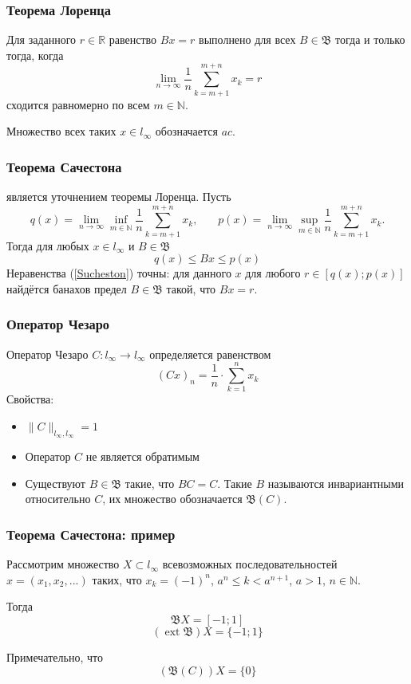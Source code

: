\documentclass[10pt,pdf,hyperref={unicode}]{beamer}
\begin{document}
\begin{frame}\frametitle{Теорема Лоренца}
	Для заданного $r\in\mathbb{R}$ равенство $Bx=r$ выполнено для всех $B\in\mathfrak{B}$
	тогда и только тогда, когда
	\begin{equation*}
		\lim_{n\to\infty} \frac{1}{n} \sum_{k=m+1}^{m+n} x_k = r
	\end{equation*}
	сходится равномерно по всем $m\in\mathbb{N}$.
	
	Множество всех таких $x \in l_\infty$ обозначается $ac$.
\end{frame}

\begin{frame}\frametitle{Теорема Сачестона}
	является уточнением теоремы Лоренца.
	Пусть
	\begin{equation*}
		q(x) = \lim_{n\to\infty} \inf_{m\in\mathbb{N}}  \frac{1}{n} \sum_{k=m+1}^{m+n} x_k,
		~~~~~~~~
		p(x) = \lim_{n\to\infty} \sup_{m\in\mathbb{N}}  \frac{1}{n} \sum_{k=m+1}^{m+n} x_k.
	\end{equation*}
	Тогда для любых $x\in l_\infty$ и $B\in\mathfrak{B}$
	\begin{equation}\label{Sucheston}
		q(x) \leqslant Bx \leqslant p(x)
	\end{equation}
	Неравенства (\ref{Sucheston}) точны:
	для данного $x$ для любого $r\in[q(x); p(x)]$ найдётся банахов предел
	$B\in\mathfrak{B}$ такой, что $Bx = r$.
\end{frame}

\begin{frame}\frametitle{Оператор Чезаро}
	Оператор Чезаро $C:l_\infty\to l_\infty$ определяется равенством
	\begin{equation*}
		(Cx)_n = \frac{1}{n} \cdot \sum_{k=1}^n x_k
	\end{equation*}
	Свойства:
	\begin{itemize}
		\item
			$\|C\|_{l_\infty,l_\infty} = 1$
		\item
			Оператор $C$ не является обратимым
		\item
			Существуют $B\in\mathfrak{B}$ такие, что $BC=C$.
			Такие $B$ называются инвариантными относительно $C$,
			их множество обозначается $\mathfrak{B}(C)$.
	\end{itemize}
\end{frame}

\begin{frame}\frametitle{Теорема Сачестона: пример}
	Рассмотрим множество $X \subset l_\infty$
	всевозможных последовательностей $x=(x_1,x_2,...)$ таких,
	что $x_k = (-1)^n$, $a^n \leqslant k < a^{n+1}$, $a>1$, $n\in\mathbb{N}$.
	
	Тогда
	$$
		\mathfrak{B}X = [-1; 1]
	$$
	$$
		(\operatorname{ext}\mathfrak{B})X = \{-1; 1\}
	$$
	
	Примечательно, что
	$$
		(\mathfrak{B}(C))X = \{0\}
	$$
\end{frame}
\end{document}
